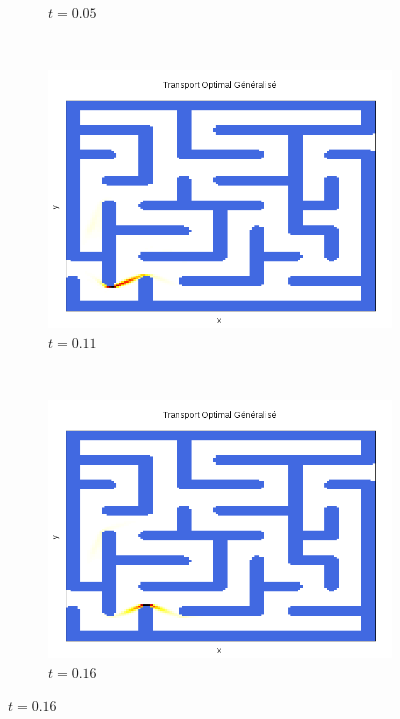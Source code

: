 \documentclass[a4paper,12pt]{article}
\begin{document}
\begin{figure}[!h]
\begin{subfigure}[b]{0.23\linewidth}
\caption*{$t=0.05$}
\end{subfigure}
~
\begin{subfigure}[b]{0.23\linewidth}
\includegraphics[width=\linewidth]{img/2DLabyrinthe/T_00012.png}
\caption*{$t=0.11$}
\end{subfigure}
~
\begin{subfigure}[b]{0.23\linewidth}
\includegraphics[width=\linewidth]{img/2DLabyrinthe/T_00017.png}
\caption*{$t=0.16$}
\end{subfigure}


\end{figure}
\end{document}
